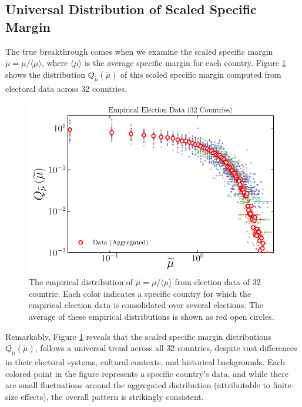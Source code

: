 \subsection{Universal Distribution of Scaled Specific Margin}

The true breakthrough comes when we examine the scaled specific margin $\widetilde{\mu} = \mu/\langle\mu\rangle$, where $\langle\mu\rangle$ is the average specific margin for each country. Figure \ref{fig:universality_empirical} shows the distribution $Q_{\widetilde{\mu}}\left(\widetilde{\mu}\right)$ of this scaled specific margin computed from electoral data across 32 countries.

\begin{figure}[H]
    \centering
    \includegraphics[width=\textwidth]{chapters/chapter4/universality_empirical.pdf}
    \caption{The empirical distribution of $\widetilde{\mu} = \mu/\langle \mu \rangle$ from election data of 32 countrie. Each color indicates a specific country for which the empirical election data is consolidated over several elections. The average of these empirical distributions is shown as red open circles.}
    \label{fig:universality_empirical}
\end{figure}

Remarkably, Figure \ref{fig:universality_empirical} reveals that the scaled specific margin distributions $Q_{\widetilde{\mu}}\left(\widetilde{\mu}\right)$, follows a universal trend across all 32 countries, despite vast differences in their electoral systems, cultural contexts, and historical backgrounds. Each colored point in the figure represents a specific country's data, and while there are small fluctuations around the aggregated distribution (attributable to finite-size effects), the overall pattern is strikingly consistent. 

